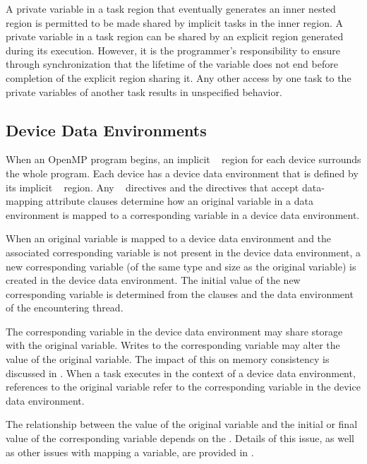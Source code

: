 A private variable in a task region that eventually generates an inner nested 
region is permitted to be made shared by implicit tasks in the inner  region.
A private variable in a task region can be shared by an explicit  region generated
during its execution. However, it is the programmer’s responsibility to ensure through
synchronization that the lifetime of the variable does not end before completion of the
explicit  region sharing it. Any other access by one task to the 
private variables of another task results in unspecified behavior.




\subsection{Device Data Environments}
\label{subsec:Device Data Environments}
When an OpenMP program begins, an implicit ~ region for each device surrounds the whole program. Each device has a device data environment that is defined by its implicit ~ region. Any ~ directives and the directives that accept data-mapping attribute clauses determine how an original variable in a data environment is mapped to a corresponding variable in a device data environment.

When an original variable is mapped to a device data environment and the associated corresponding variable is not present in the device data environment, a new corresponding variable (of the same type and size as the original variable) is created in the device data environment. The initial value of the new corresponding variable is determined from the clauses and the data environment of the encountering thread.

The corresponding variable in the device data environment may share storage with the
original variable. Writes to the corresponding variable may alter the value of the original
variable. The impact of this on memory consistency is discussed in 
. 
When a task executes in the context of a device data environment, references to  
the original variable refer to the corresponding variable in the device data environment.

The relationship between the value of the original variable and the initial or final value
of the corresponding variable depends on the . Details of this issue, as well as
other issues with mapping a variable, are provided in .


